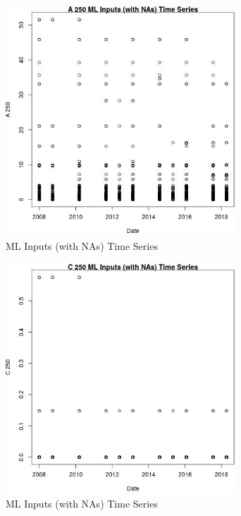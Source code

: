 \begin{figure} 
\centering  
\includegraphics[width=0.77\textwidth]{Code_Outputs/Report_ML_input_PM25_Step4_part_e_de_duplicated_aves_compiled_2019-05-18wNAs_A_250vDate.jpg} 
\caption{\label{fig:Report_ML_input_PM25_Step4_part_e_de_duplicated_aves_compiled_2019-05-18wNAsA_250vDate}ML Inputs (with NAs) Time Series} 
\end{figure} 
 

\begin{figure} 
\centering  
\includegraphics[width=0.77\textwidth]{Code_Outputs/Report_ML_input_PM25_Step4_part_e_de_duplicated_aves_compiled_2019-05-18wNAs_C_250vDate.jpg} 
\caption{\label{fig:Report_ML_input_PM25_Step4_part_e_de_duplicated_aves_compiled_2019-05-18wNAsC_250vDate}ML Inputs (with NAs) Time Series} 
\end{figure} 
 

